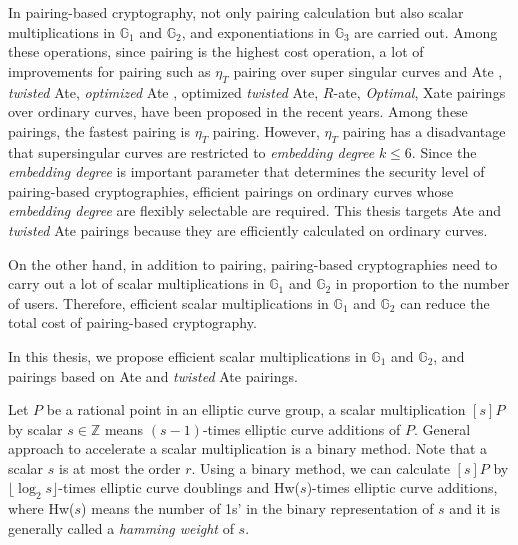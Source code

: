 In pairing-based cryptography, not only pairing calculation but also scalar multiplications in $\mathbb{G}_1$ and $\mathbb{G}_2$, and exponentiations in $\mathbb{G}_3$ are carried out.
Among these operations, since pairing is the highest cost operation, a lot of improvements for pairing such as $\eta_T$ pairing over super singular curves and Ate \cite{PAIRING:Hess08}, {\it twisted} Ate\cite{PAIRING:Hess08}, {\it optimized} Ate \cite{EPRINT:MKHO07}, optimized {\it twisted} Ate\cite{EPRINT:MKHO07}, $R$-ate\cite{r_ate}, {\it Optimal}\cite{DBLP:journals/tit/Vercauteren10}, Xate \cite{PAIRING:NASKM08} pairings over ordinary curves, have been proposed in the recent years.
Among these pairings, the fastest pairing is $\eta_T$ pairing.
However, $\eta_T$ pairing has a disadvantage that supersingular curves are restricted to {\it embedding degree} $k\leq6$. 
Since the {\it embedding degree} is important parameter that determines the security level of pairing-based cryptographies, efficient pairings on ordinary curves whose {\it embedding degree} are flexibly selectable are required.
This thesis targets Ate and {\it twisted} Ate pairings because they are efficiently calculated on ordinary curves.

On the other hand, in addition to pairing, pairing-based cryptographies need to carry out a lot of scalar multiplications in $\mathbb{G}_1$ and $\mathbb{G}_2$ in proportion to the number of users.
Therefore, efficient scalar multiplications in $\mathbb{G}_1$ and $\mathbb{G}_2$ can reduce the total cost of pairing-based cryptography.

In this thesis, we propose efficient scalar multiplications in $\mathbb{G}_1$ and $\mathbb{G}_2$, and pairings based on Ate and {\it twisted} Ate pairings.

Let $P$ be a rational point in an elliptic curve group, a scalar multiplication $[s]P$ by scalar $s\in{\mathbb Z}$ means $(s-1)$-times elliptic curve additions of $P$.
General approach to accelerate a scalar multiplication is a binary method.
Note that a scalar $s$ is at most the order $r$.
Using a binary method, we can calculate $[s]P$ by $\lfloor \log_2 s \rfloor$-times elliptic curve doublings and Hw($s$)-times elliptic curve additions, where Hw($s$) means the number of 1s' in the binary representation of $s$ and it is generally called a {\it hamming weight} of $s$.  

